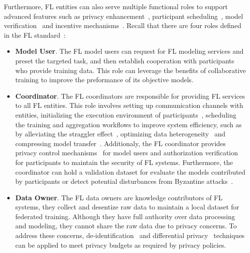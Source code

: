 Furthermore, FL entities can also serve multiple functional roles to support advanced features such as privacy enhancement~\cite{geyer2017differentially, bonawitz2017practical, niu2020billion}, participant scheduling~\cite{li2022federated, abdulrahman2020fedmccs}, model verification~\cite{tekgul2021waffle, shao2022fedtracker} and incentive mechanisms~\cite{yu2020fairness}.
Recall that there are four roles defined in the FL standard~\cite{IEEEstd3652}:

\begin{itemize}
    \item \textbf{Model User}. The FL model users can request for FL modeling services and preset the targeted task, and then establish cooperation with participants who provide training data. This role can leverage the benefits of collaborative training to improve the preformance of its objective models.
    
    \item \textbf{Coordinator}. The FL coordinators are responsible for providing FL services to all FL entities. This role involves setting up communication channels with entities, initializing the execution environment of participants~\cite{hanzlik2021mlcapsule}, scheduling the training and aggregation workflows to improve system efficiency, such as by alleviating the straggler effect~\cite{li2021fedsae, chai2020tifl}, optimizing data heterogeneity~\cite{duan2019astraea, abdulrahman2020fedmccs} and compressing model transfer~\cite{konevcny2016federated, sattler2019robust}.
    Additionaly, the FL coordinator provides privacy control mechanisms~\cite{bonawitz2017practical, el2022differential, hesamifard2018privacy} for model users and authorization verification for participants to maintain the security of FL systems. 
    Furthermore, the coordinator can hold a validation dataset for evaluate the models contributed by participants or detect potential disturbances from Byzantine attacks~\cite{sattler2020byzantine}.

    \item \textbf{Data Owner}. The FL data owners are knowledge contributors of FL systems, they collect and desentize raw data to maintain a local dataset for federated training. Although they have full authority over data processing and modeling, they cannot share the raw data due to privacy concerns. To address these concerns, de-identification~\cite{act1996health} and differential privacy~\cite{dwork2006differential} techniques can be applied to meet privacy budgets as required by privacy policies.
    

\end{itemize}
